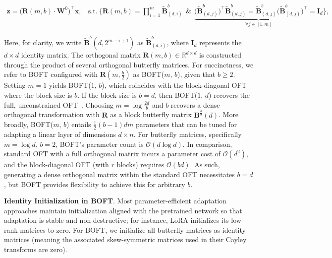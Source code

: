 \begin{equation}
    \begin{aligned}\nonumber
    \bm{z} = \big(\bm{R}(m, b) \cdot \bm{W}^0\big)^\top \bm{x},~~~~\text{s.t.}~\bigg\{ \bm{R}(m, b) = \prod_{i=1}^m \tilde{\bm{B}}^b_{(d, i)}~~\&~~\underbrace{\big(\tilde{\bm{B}}^b_{(d, j)}\big)^\top\tilde{\bm{B}}^b_{(d, j)} = \tilde{\bm{B}}^b_{(d, j)}\big(\tilde{\bm{B}}^b_{(d, j)}\big)^\top = \bm{I}_d}_{\forall j\in [1, m]}\bigg\},
    \end{aligned}
\end{equation}

Here, for clarity, we write $\tilde{\bm{B}}^b(d, 2^{m - i + 1})$ as $\tilde{\bm{B}}^b_{(d, i)}$, where $\bm{I}_d$ represents the $d \times d$ identity matrix. The orthogonal matrix $\bm{R}(m, b)\in\mathbb{R}^{d\times d}$ is constructed through the product of several orthogonal butterfly matrices. For succinctness, we refer to BOFT configured with $\bm{R}(m, \frac{b}{2})$ as BOFT($m$, $b$), given that $b \geq 2$. Setting $m = 1$ yields BOFT($1$, $b$), which coincides with the block-diagonal OFT~\cite{qiu2023controlling} where the block size is $b$. If the block size is $b = d$, then BOFT($1$, $d$) recovers the full, unconstrained OFT~\cite{qiu2023controlling}. Choosing $m = \log \frac{2d}{b}$ and $b$ recovers a dense orthogonal transformation with $\bm{R}$ as a block butterfly matrix $\bm{B}^{\frac{b}{2}}(d)$. More broadly, BOFT($m$, $b$) entails $\frac{1}{2}(b-1)dm$ parameters that can be tuned for adapting a linear layer of dimensions $d \times n$. For butterfly matrices, specifically $m = \log d$, $b = 2$, BOFT’s parameter count is $\mathcal{O}(d\log d)$. In comparison, standard OFT with a full orthogonal matrix incurs a parameter cost of $\mathcal{O}(d^2)$, and the block-diagonal OFT (with $r$ blocks) requires $\mathcal{O}(bd)$. As such, generating a dense orthogonal matrix within the standard OFT necessitates $b = d$, but BOFT provides flexibility to achieve this for arbitrary $b$.

\textbf{Identity Initialization in BOFT}. Most parameter-efficient adaptation approaches maintain initialization aligned with the pretrained network so that adaptation is stable and non-destructive; for instance, LoRA initializes its low-rank matrices to zero. For BOFT, we initialize all butterfly matrices as identity matrices (meaning the associated skew-symmetric matrices used in their Cayley transforms are zero).

